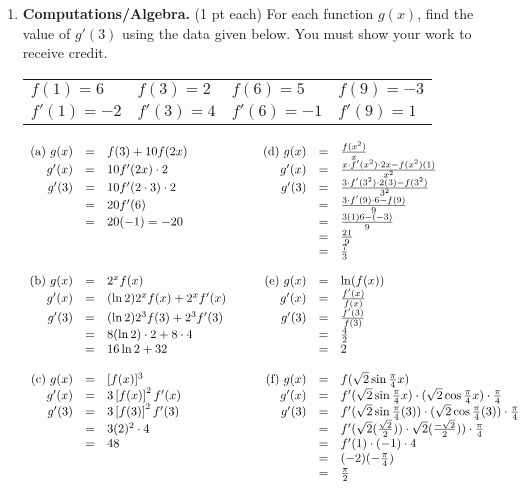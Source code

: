 \documentclass[11pt,letterpaper]{article}
\begin{document}
\begin{enumerate}
\pagebreak
\item \textbf{Computations/Algebra.} (1 pt each)  For each function $g(x)$, find the value of $g'(3)$ using the data given below. You must show your work to receive credit.
\begin{center}
\begin{tabular}{l l l l}
$f(1)=6$ & $f(3)=2$ & $f(6)=5$ & $f(9)=-3$ \\
$f'(1)=-2$ & $f'(3)=4$ & $f'(6)=-1$ & $f'(9)=1$ \\
\end{tabular}
\end{center}
\vskip 3pt
$\begin{array}{rcl cc rcl}
\text{(a) } g(x) &=& f(3) + 10f(2x) &&& \text{(d) } g(x) &=& \frac{f(x^2)}{x} \\
g'(x) &=& 10f'(2x)\cdot 2          &&& g'(x) &=& \frac{x\cdot f'(x^2)\cdot 2x-f(x^2)(1)}{x^2} \\
g'(3) &=& 10f'(2\cdot 3)\cdot 2    &&& g'(3) &=& \frac{3\cdot f'(3^2)\cdot 2(3) -f(3^2)}{3^2} \\
&=& 20f'(6)                        &&& &=& \frac{3\cdot f'(9)\cdot 6 -f(9)}{9} \\
&=& 20(-1)=-20                     &&& &=& \frac{3(1)6-(-3)}{9} \\
& &                                &&& &=& \frac{21}{9} \\
& &                                &&& &=& \frac{7}{3} \\
&&&&&&& \\
\text{(b) } g(x) &=& 2^x f(x)       &&& \text{(e) } g(x) &=& \ln (f(x)) \\
g'(x) &=& (\ln{2})2^xf(x) + 2^xf'(x) &&& g'(x) &=& \frac{f'(x)}{f(x)} \\
g'(3) &=& (\ln{2})2^3f(3) + 2^3f'(3) &&& g'(3) &=& \frac{f'(3)}{f(3)} \\
&=& 8(\ln{2})\cdot 2 +8\cdot 4        &&& &=& \frac{4}{2} \\
&=& 16\ln{2}+32                      &&& &=& 2 \\
&&&&&&& \\
\text{(c) } g(x) &=& [f(x)]^3       &&& \text{(f) } g(x) &=& f(\sqrt{2} \sin \frac{\pi}{4}x) \\
g'(x) &=& 3\left[f(x)\right]^2f'(x) &&& g'(x) &=& f'(\sqrt{2}\sin{\frac{\pi }{4}x)}\cdot (\sqrt{2}\cos{\frac{\pi }{4}x})\cdot \frac{\pi }{4} \\
g'(3) &=& 3\left[f(3)\right]^2f'(3) &&& g'(3) &=& f'(\sqrt{2}\sin{\frac{\pi }{4}(3))}\cdot (\sqrt{2}\cos{\frac{\pi }{4}(3)})\cdot \frac{\pi }{4} \\
&=& 3(2)^2\cdot 4 &&& &=& f'(\sqrt{2}(\frac{\sqrt{2}}{2}))\cdot \sqrt{2}(\frac{-\sqrt{2}}{2}))\cdot \frac{\pi }{4} \\
&=& 48 &&& &=& f'(1)\cdot (-1)\cdot 4 \\
&& &&& &=& (-2)(-\frac{\pi }{4}) \\
&& &&& &=& \frac{\pi }{2} 
\end{array}$

\end{enumerate}


\vspace{1pc}
\end{document}
